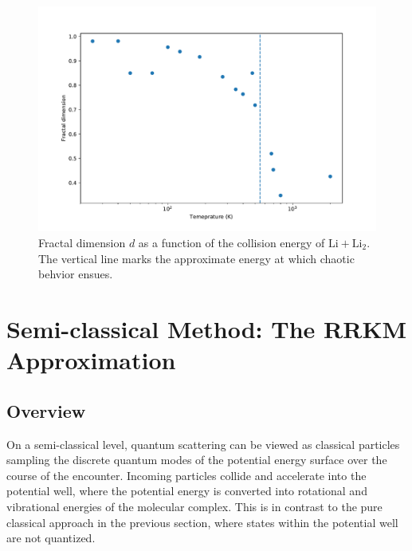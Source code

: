 \documentclass[%
 reprint,
 amsmath,amssymb,
 aps,
 nofootinbib
]{revtex4-1}
\begin{document}
\begin{figure}[ht]
\begin{center}
\includegraphics[width=1.125\linewidth]{fractal_dim.pdf}
\caption{Fractal dimension $d$ as a function of the collision energy of $\mathrm{Li} + \mathrm{Li_2}$. The vertical line marks the approximate energy at which chaotic behvior ensues.}
\label{fig:frac_dim}
\end{center}
\end{figure}

 

\section{\label{sec:RRKM}Semi-classical Method: The RRKM Approximation}

\subsection{\label{sec:RRKM-overview} Overview}

On a semi-classical level, quantum scattering can be viewed as classical particles sampling the discrete quantum modes of the potential energy surface over the course of the encounter. Incoming particles collide and accelerate into the potential well, where the potential energy is converted into rotational and vibrational energies of the molecular complex. This is in contrast to the pure classical approach in the previous section, where states within the potential well are not quantized. 
\end{document}
